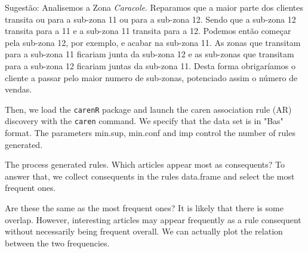 \documentclass[a4paper]{article}
\begin{document}
Sugestão:
Analisemos a Zona \textit{Caracole}. Reparamos que a maior parte dos clientes transita ou para a sub-zona 11 ou para a sub-zona 12. Sendo que a sub-zona 12 transita para a 11 e a sub-zona 11 transita para a 12. Podemos então começar pela sub-zona 12, por exemplo, e acabar na sub-zona 11. As zonas que transitam para a sub-zona 11 ficariam junta da sub-zona 12 e as sub-zonas que transitam para a sub-zona 12 ficariam juntas da sub-zona 11. Desta forma obrigaríamos o cliente a passar pelo maior numero de sub-zonas, potenciado assim o número de vendas.


Then, we load the {\tt carenR} package and launch the caren association rule (AR) discovery with the {\tt caren} command. We specify that the data set is in "Bas" format. The parameters min.sup, min.conf and imp control the number of rules generated.



The process generated  rules. Which articles appear most as consequents? To answer that, we collect consequents in the rules data.frame and select the most frequent ones.


Are these the same as the most frequent ones? It is likely that there is some overlap. However, interesting articles may appear frequently as a rule consequent without necessarily being frequent overall. We can actually plot the relation between the two frequencies.
\end{document}
